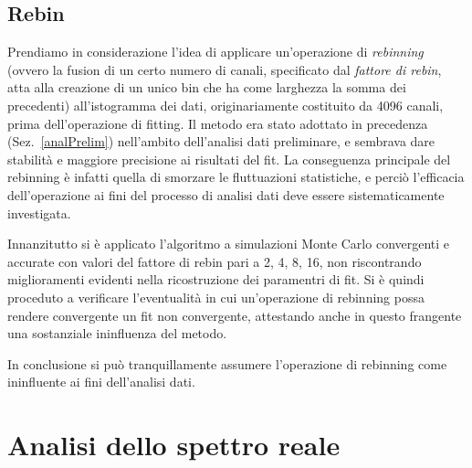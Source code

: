 \documentclass[10pt, oneside, a4paper]{article}   	%
\begin{document}
\subsection{Rebin}
Prendiamo in considerazione l'idea di applicare un'operazione di \textit{rebinning} (ovvero la fusion di un certo numero di canali, specificato dal \textit{fattore di rebin}, atta alla creazione di un unico bin che ha come larghezza la somma dei precedenti) all'istogramma dei dati, originariamente costituito da 4096 canali, prima dell'operazione di fitting. Il metodo era stato adottato in precedenza (Sez.~\ref{analPrelim}) nell'ambito dell'analisi dati preliminare, e sembrava dare stabilità e maggiore precisione ai risultati del fit. La conseguenza principale del rebinning è infatti quella di smorzare le fluttuazioni statistiche, e perciò l'efficacia dell'operazione ai fini del processo di analisi dati deve essere sistematicamente investigata.

Innanzitutto si è applicato l'algoritmo a simulazioni Monte Carlo convergenti e accurate con valori del fattore di rebin pari a 2, 4, 8, 16, non riscontrando miglioramenti evidenti nella ricostruzione dei paramentri di fit. Si è quindi proceduto a verificare l'eventualità in cui un'operazione di rebinning possa rendere convergente un fit non convergente, attestando anche in questo frangente una sostanziale ininfluenza del metodo.

In conclusione si può tranquillamente assumere l'operazione di rebinning come ininfluente ai fini dell'analisi dati.
%
\section{Analisi dello spettro reale}
%    
%
\appendix


\end{document}
